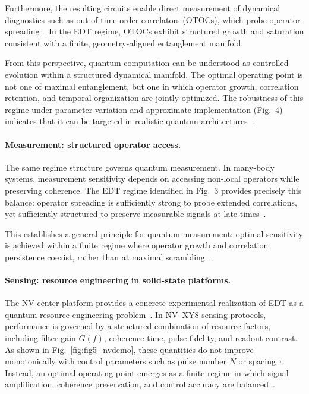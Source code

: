 \documentclass[twocolumn,10pt]{article}
\begin{document}
Furthermore, the resulting circuits enable direct measurement of dynamical diagnostics such as out-of-time-order correlators (OTOCs), which probe operator spreading~\cite{Larkin1969,Swingle2018}. In the EDT regime, OTOCs exhibit structured growth and saturation consistent with a finite, geometry-aligned entanglement manifold.

From this perspective, quantum computation can be understood as controlled evolution within a structured dynamical manifold. The optimal operating point is not one of maximal entanglement, but one in which operator growth, correlation retention, and temporal organization are jointly optimized. The robustness of this regime under parameter variation and approximate implementation (Fig.~4) indicates that it can be targeted in realistic quantum architectures~\cite{Preskill2018,Arute2019}.

\paragraph*{Measurement: structured operator access.}
The same regime structure governs quantum measurement. In many-body systems, measurement sensitivity depends on accessing non-local operators while preserving coherence. The EDT regime identified in Fig.~3 provides precisely this balance: operator spreading is sufficiently strong to probe extended correlations, yet sufficiently structured to preserve measurable signals at late times~\cite{KimHuse2013,Choi2016}.

This establishes a general principle for quantum measurement: optimal sensitivity is achieved within a finite regime where operator growth and correlation persistence coexist, rather than at maximal scrambling~\cite{Swingle2018}.

\paragraph*{Sensing: resource engineering in solid-state platforms.}
The NV-center platform provides a concrete experimental realization of EDT as a quantum resource engineering problem~\cite{Degen2017,Barry2020}. In NV--XY8 sensing protocols, performance is governed by a structured combination of resource factors, including filter gain $G(f)$, coherence time, pulse fidelity, and readout contrast. As shown in Fig.~\ref{fig:fig5_nvdemo}, these quantities do not improve monotonically with control parameters such as pulse number $N$ or spacing $\tau$. Instead, an optimal operating point emerges as a finite regime in which signal amplification, coherence preservation, and control accuracy are balanced~\cite{Casola2018}.
\end{document}
